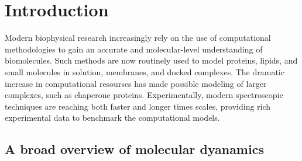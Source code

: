 \chapter{Introduction} \label{intro}


Modern biophysical research increasingly rely on the use of computational methodologies to gain an accurate and molecular-level understanding of biomolecules. 
Such methods are now routinely used to model proteins, lipids, and small molecules in solution, membranes, and docked complexes. 
The dramatic increase in computational resourses has made possible modeling of larger complexes, such as chaperone proteins. 
Experimentally, modern spectroscopic techniques are reaching both faster and longer times scales, providing rich experimental data to benchmark the computational models. 

\section{A broad overview of molecular dyanamics}


